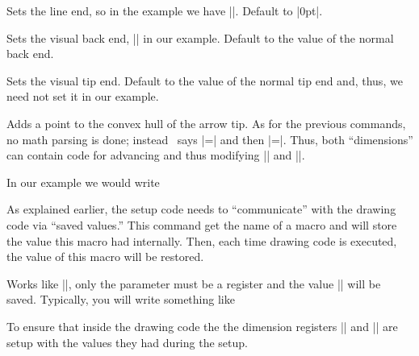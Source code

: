\begin{command}{\pgfdeclarearrow{}}
\begin{itemize}
    \begin{command}{\pgfarrowssetlineend{}}
      Sets the line end, so in the example we have
      |\pgfarrowssettipend{-1cm}|. Default to |0pt|.
    \end{command}

    \begin{command}{\pgfarrowssetvisualbackend{}}
      Sets the visual back end, |\pgfarrowssetvisualbackend{-2cm}| in
      our example. Default to the value of the normal back end.
    \end{command}

    \begin{command}{\pgfarrowssetvisualtipend{}}
      Sets the visual tip end. Default to the value of the normal tip
      end and, thus, we need not set it in our example.
    \end{command}

    \begin{command}{\pgfarrowshullpoint{}}
      Adds a point to the convex hull of the arrow tip. As for the
      previous commands, no math parsing is done; instead \pgfname\
      says |\pgf@x=| and then |\pgf@y=|\meta{y
        dimension}. Thus, both ``dimensions'' can contain code for
      advancing and thus modifying |\pgf@x| and |\pgf@y|.

      In our example we would write
\begin{codeexample}
\pgfarrowshullpoint{1cm}{0pt}
\pgfarrowshullpoint{-3cm}{2cm}
\pgfarrowshullpoint{-3cm}{-2cm}
\end{codeexample}
    \end{command}

    \begin{command}{\pgfarrowssave{}}
      As explained earlier, the setup code needs to ``communicate''
      with the drawing code via ``saved values.'' This command get the
      name of a macro and will store the value this macro had
      internally. Then, each time drawing code is executed, the value
      of this macro will be restored.
    \end{command}

    \begin{command}{\pgfarrowssavethe{}}
      Works like |\pgfarrowssave|, only the parameter must be a
      register and the value |\the| will be saved.
      Typically, you will write something like
\begin{codeexample}
\pgfarrowssavethe{\pgfarrowlength}
\pgfarrowssavethe{\pgfarrowwidth}
\end{codeexample}
      To ensure that inside the drawing code the the dimension
      registers |\pgfarrowlength| and |\pgfarrowwidth| are setup with
      the values they had during the setup.
    \end{command}
    

\end{itemize}
\end{command}
